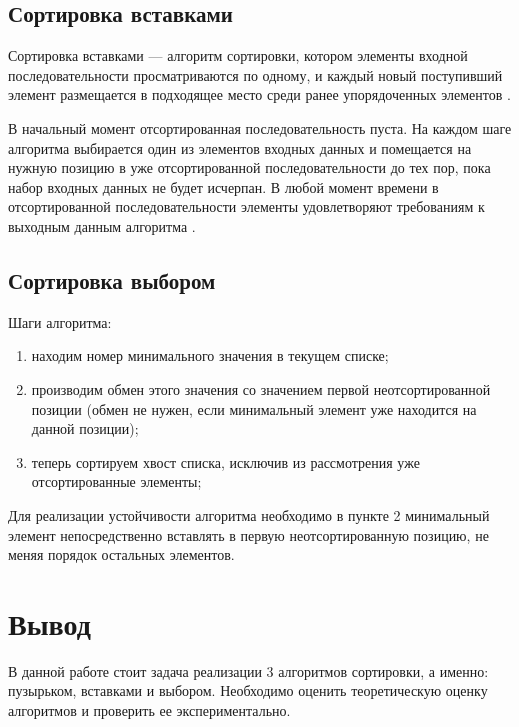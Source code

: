 \subsection{Сортировка вставками}

Сортировка вставками — алгоритм сортировки, котором элементы входной последовательности просматриваются по одному, и каждый новый поступивший элемент размещается в подходящее место среди ранее упорядоченных элементов \cite{Knut}.

В начальный момент отсортированная последовательность пуста.
На каждом шаге алгоритма выбирается один из элементов входных данных и помещается на нужную позицию в уже отсортированной последовательности до тех пор, пока набор входных данных не будет исчерпан.
В любой момент времени в отсортированной последовательности элементы удовлетворяют требованиям к выходным данным алгоритма \cite[стр. 38–45]{Kormen}.

\subsection{Сортировка выбором}

Шаги алгоритма:
\begin{enumerate}
	\item находим номер минимального значения в текущем списке;
	\item производим обмен этого значения со значением первой неотсортированной позиции (обмен не нужен, если минимальный элемент уже находится на данной позиции);
	\item теперь сортируем хвост списка, исключив из рассмотрения уже отсортированные элементы;
\end{enumerate}

Для реализации устойчивости алгоритма необходимо в пункте 2 минимальный элемент непосредственно вставлять в первую неотсортированную позицию, не меняя порядок остальных элементов. 

\section*{Вывод}
В данной работе стоит задача реализации 3 алгоритмов сортировки, а именно: пузырьком, вставками и выбором.
Необходимо оценить теоретическую оценку алгоритмов и проверить ее экспериментально.
